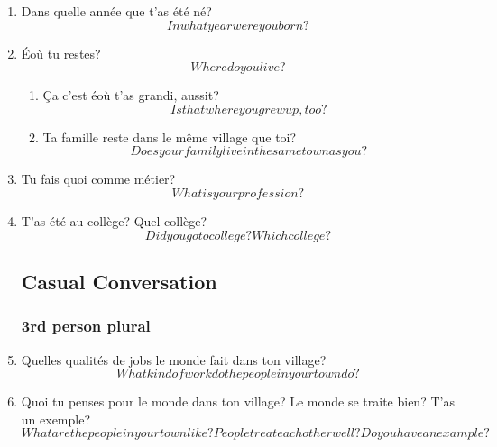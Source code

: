 
\ifdefined \longtrans
\else
  \newcommand{\longtrans}[1]{\[#1\]}
\fi

\begin{enumerate}
  \subsection{Demographics}
    \item Dans quelle année que t'as été né?\\
      \longtrans{In what year were you born?}
    \item Éoù tu restes?\\
      \longtrans{Where do you live?}
    \begin{enumerate}
      \item Ça c'est éoù t'as grandi, aussit?\\
        \longtrans{Is that where you grew up, too?}
      \item Ta famille reste dans le même village que toi?\\
        \longtrans{Does your family live in the same town as you?}
    \end{enumerate}
    \item Tu fais quoi comme métier?\\
      \longtrans{What is your profession?}
    \item T'as été au collège? Quel collège?\\
      \longtrans{Did you go to college? Which college?}
  \subsection{Casual Conversation}
    \subsubsection{3rd person plural}
      \item Quelles qualités de jobs le monde fait dans ton village?\\
        \longtrans{What kind of work do the people in your town do?}
      \item Quoi tu penses pour le monde dans ton village? Le monde se traite bien? T'as un exemple?\\
        \longtrans{What are the people in your town like? People treat each other well? Do you have an example?}

\end{enumerate}
